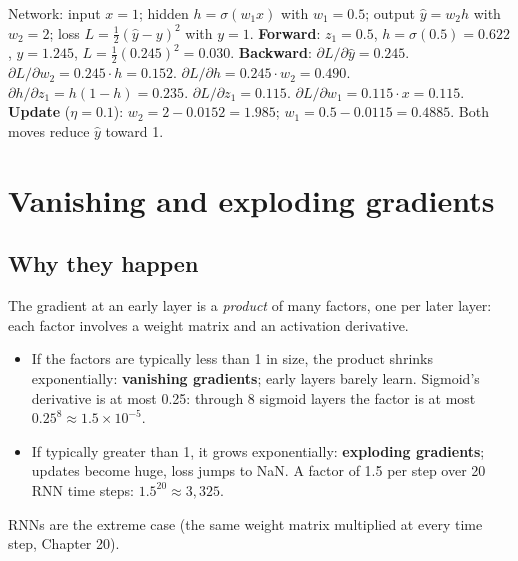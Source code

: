 \begin{example}
Network: input $x = 1$; hidden $h = \sigma(w_1x)$ with $w_1 = 0.5$; output $\hat y = w_2h$ with $w_2 = 2$; loss $L = \frac12(\hat y - y)^2$ with $y = 1$.
\textbf{Forward}: $z_1 = 0.5$, $h = \sigma(0.5) = 0.622$, $\hat y = 1.245$, $L = \frac12(0.245)^2 = 0.030$.
\textbf{Backward}: $\partial L/\partial\hat y = 0.245$. $\partial L/\partial w_2 = 0.245\cdot h = 0.152$.
$\partial L/\partial h = 0.245\cdot w_2 = 0.490$. $\partial h/\partial z_1 = h(1-h) = 0.235$. $\partial L/\partial z_1 = 0.115$. $\partial L/\partial w_1 = 0.115\cdot x = 0.115$.
\textbf{Update} ($\eta = 0.1$): $w_2 = 2 - 0.0152 = 1.985$; $w_1 = 0.5 - 0.0115 = 0.4885$. Both moves reduce $\hat y$ toward 1.
\end{example}

\section{Vanishing and exploding gradients}
\subsection{Why they happen}
The gradient at an early layer is a \emph{product} of many factors, one per later layer: each factor involves a weight matrix and an activation derivative.
\begin{itemize}
\item If the factors are typically less than 1 in size, the product shrinks exponentially: \textbf{vanishing gradients}; early layers barely learn. Sigmoid's
  derivative is at most 0.25: through 8 sigmoid layers the factor is at most $0.25^8\approx1.5\times10^{-5}$.
\item If typically greater than 1, it grows exponentially: \textbf{exploding gradients}; updates become huge, loss jumps to NaN. A factor of 1.5 per step over 20
  RNN time steps: $1.5^{20}\approx3{,}325$.
\end{itemize}
RNNs are the extreme case (the same weight matrix multiplied at every time step, Chapter 20).

